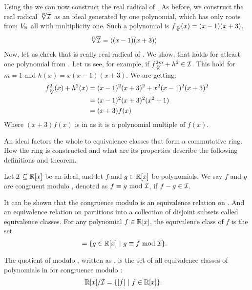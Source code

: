 \begin{example}
  Using the  we can now construct the real radical of \Ideal{}.
  As before, we construct the real radical $\sqrt[R]{\mathcal{I}}{}$ as an ideal generated by one polynomial, which has only roots from $V_{\mathbb{R}}$ all with multiplicity one.
  Such a polynomial is $f_{\sqrt[\mathbb{R}]{}}(x) = (x-1)(x+3)$.
  \begin{align}
    \sqrt[R]{\mathcal{I}} &= \langle(x-1)(x+3) \rangle
  \end{align}
  Now, let us check that \rrIdeal{} is really real radical of \Ideal.
  We show, that  holds for atleast one polynomial from \rrIdeal.
  Let us see, for example, if $f_{\sqrt[\mathbb{R}]{}}^{2m} + h^2 \in \mathcal{I}$.
  This hold for $m = 1$ and $h(x) = x(x-1)(x+3)$.
  We are getting:
  \begin{align}
    f_{\sqrt[\mathbb{R}]{}}^{2}(x) + h^2(x) &= (x-1)^2(x+3)^2 + x^2(x-1)^2(x+3)^2\\
    &= (x-1)^2(x+3)^2(x^2+1)\\
    &= (x+3)f(x)
  \end{align}
  Where $(x+3)f(x)$ is in \Ideal{} as it is a polynomial multiple of $f(x)$.

\end{example}

An ideal factors the whole \Rx{} to equivalence classes that form a commutative ring.
How the ring is constructed and what are its properties describe the following definitions and theorem.

\begin{definition}
Let $\mathcal{I} \subseteq \mathbb{R}[x]$ be an ideal, and let $f$ and $g \in \mathbb{R}[x]$ be polynomials.
We say $f$ and $g$ are congruent modulo \Ideal{} , denoted as $f \equiv g \text{ mod } \mathcal{I}$, if $f - g \in \mathcal{I}$.
\end{definition}

It can be shown that the congruence modulo \Ideal{} is an equivalence relation on \Rx.
And an equivalence relation on \Rx{} partitions \Rx{} into a collection of disjoint subsets called equivalence classes.
For any polynomial $f \in \mathbb{R}[x]$, the equivalence class of $f$ is the set
\begin{align}
  [f] &= \{g \in \Rx\ |\ g \equiv f \text{ mod } \Ideal\}.
\end{align}

\begin{definition}
  The quotient of \Rx{} modulo \Ideal{}, written as \RxI, is the set of all equivalence classes of polynomials in \Rx{} for congruence modulo \Ideal{}:
  \begin{align}
    \mathbb{R}[x] / \mathcal{I} &= \{[f]\ |\ f \in \mathbb{R}[x]\}.
  \end{align}
\end{definition}

